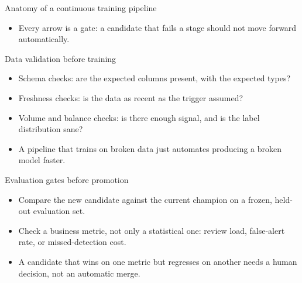 \begin{frame}{Anatomy of a continuous training pipeline}
\centering
{}
\vspace{0.6em}
\begin{itemize}
\item Every arrow is a gate: a candidate that fails a stage should not move forward automatically.
\end{itemize}
\coursefooter
\end{frame}

\begin{frame}{Data validation before training}
\begin{itemize}
\item Schema checks: are the expected columns present, with the expected types?
\item Freshness checks: is the data as recent as the trigger assumed?
\item Volume and balance checks: is there enough signal, and is the label distribution sane?
\item A pipeline that trains on broken data just automates producing a broken model faster.
\end{itemize}
\coursefooter
\end{frame}

\begin{frame}{Evaluation gates before promotion}
\begin{itemize}
\item Compare the new candidate against the current champion on a frozen, held-out evaluation set.
\item Check a business metric, not only a statistical one: review load, false-alert rate, or missed-detection cost.
\item A candidate that wins on one metric but regresses on another needs a human decision, not an automatic merge.
\end{itemize}
\coursefooter
\end{frame}

